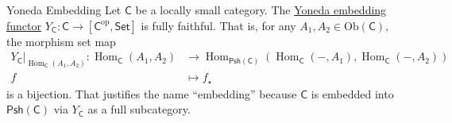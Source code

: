 \begin{corollary}{Yoneda Embedding}{}
    Let $\mathsf{C}$ be a locally small category. The \hyperref[th:yoneda_embedding_functor]{Yoneda embedding functor} $Y_\mathsf{C}:\mathsf{C}\to \left[\mathsf{C}^{\mathrm{op}},\mathsf{Set}\right]$ is fully faithful. That is, for any $A_1,A_2\in\mathrm{Ob}\left(\mathsf{C}\right)$, the morphism set map 
    \begin{align*}
        \left.Y_{\mathsf{C}}\right|_{\operatorname{Hom}_{\mathsf{C}}\left(A_1,A_2\right)}:\operatorname{Hom}_{\mathsf{C}}\left(A_1,A_2\right) &\longrightarrow\operatorname{Hom}_{\mathsf{Psh}(\mathsf{C})}\left(\operatorname{Hom}_{\mathsf{C}}\left(-,A_1\right), \operatorname{Hom}_{\mathsf{C}}\left(-,A_2\right)\right) \\
         f & \longmapsto f_\star
    \end{align*}
    is a bijection. That justifies the name ``embedding'' because $\mathsf{C}$ is embedded into $\mathsf{Psh}(\mathsf{C})$ via $Y_\mathsf{C}$ as a full subcategory.
\end{corollary}

